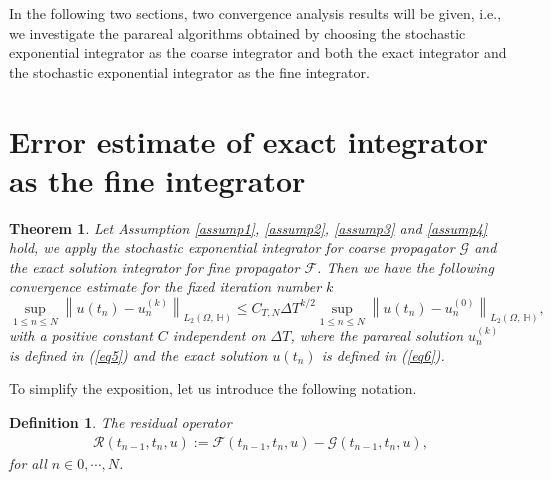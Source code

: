 \documentclass[preprint,12pt]{elsarticle}
\newtheorem{theorem}{Theorem}%
\newtheorem{definition}{Definition}
\begin{document}
	In the following two sections, two convergence analysis results will be given, i.e., we investigate the parareal algorithms obtained by choosing the stochastic exponential integrator as the coarse integrator and both the exact integrator and the stochastic exponential integrator as the fine integrator.
	\section{Error estimate of exact integrator as the fine integrator }\label{sec5}
	\begin{theorem}\label{theorem1}
		Let Assumption \ref{assump1}, \ref{assump2}, \ref{assump3} and \ref{assump4} hold,  we apply the stochastic exponential integrator for coarse propagator $\mathcal{G}$ and the exact solution integrator for fine propagator $\mathcal{F}$. Then we have the following convergence estimate for the fixed iteration number $k$
		\begin{equation}\label{eq11}
			\sup\limits_{1\leq n \leq N}\left\|u(t_{n})-u_{n}^{(k)}\right\|_{L_{2}(\Omega,\,\mathbb{H})}\leq C_{T,N} \Delta T^{k/2} \sup\limits_{1\leq n \leq N}\left\|u(t_{n})-u_{n}^{(0)}\right\|_{L_{2}(\Omega,\, \mathbb{H})},
		\end{equation}
		with a positive constant $C$ independent on $\Delta T$, where the parareal solution $u_{n}^{(k)}$ is defined in (\ref{eq5}) and the exact solution $u(t_{n})$ is defined in (\ref{eq6}).
	\end{theorem}
	
	To simplify the exposition, let us introduce the following notation.
	\begin{definition}
		The residual operator 
		\begin{align}\label{eq12}
			\mathcal{R}(t_{n-1},t_{n},u):=\mathcal{F}(t_{n-1},t_{n},u)-\mathcal{G}(t_{n-1},t_{n},u),
		\end{align}
		for all $n\in{0,\cdots,N}$.
	\end{definition}
	
\end{document}
